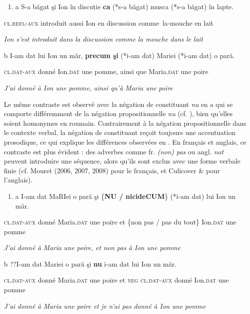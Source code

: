 \begin{enumerate}
\item a  S-a băgat şi Ion în discuție \textbf{ca} (*s-a băgat) musca (*s-a băgat) în lapte.


\end{enumerate}
\textsc{cl.refl-aux} introduit aussi Ion en discussion comme~la-mouche en lait

{\itshape
Ion s'est introduit dans la discussion comme la mouche dans le lait}

  b  I-am dat lui Ion un măr, \textbf{precum şi} (*i-am dat) Mariei (*i-am dat) o pară.

    \textsc{cl.dat-aux} donné Ion.\textsc{dat} une pomme, ainsi que Maria.\textsc{dat} une poire

{\itshape
J'ai donné à Ion une pomme, ainsi qu'à Maria une poire}

Le même contraste est observé avec la négation de constituant \textit{nu} en a qui se comporte différemment de la négation propositionnelle \textit{nu} (cf. \citet{Barbu2004}), bien qu'elles soient homonymes en roumain. Contrairement à la négation propositionnelle dans le contexte verbal, la négation de constituant reçoit toujours une accentuation prosodique, ce qui explique les différences observées en . En français et anglais, ce contraste est plus évident : des adverbes comme fr. \textit{(non) pas}  ou angl. \textit{not}  peuvent introduire une séquence, alors qu'ils sont exclus avec une forme verbale finie (cf. Mouret (2006, 2007, 2008) pour le français, et Culicover \& \citet{Jackendoff2005} pour l'anglais).


\begin{enumerate}
\item \label{bkm:Ref290289547}a  I-am dat MaRIei o pară şi \{\textbf{NU / nicideCUM}\} (*i-am dat) lui Ion un măr.


\end{enumerate}
\textsc{cl.dat-aux} donné Maria.\textsc{dat} une poire et \{non pas / pas du tout\} Ion.\textsc{dat} une pomme

{\itshape
J'ai donné à Maria une poire, et non pas à Ion une pomme}

  b  ??I-am dat Mariei o pară şi \textbf{nu} i-am dat lui Ion un măr.

\textsc{cl.dat-aux} donné Maria.\textsc{dat} une poire et \textsc{neg cl.dat-aux} donné Ion.\textsc{dat} une pomme

{\itshape
J'ai donné à Maria une poire et je n'ai pas donné à Ion une pomme}


